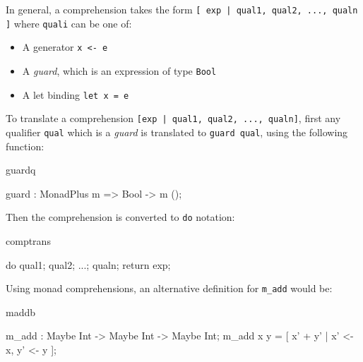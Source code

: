 \noindent
In general, a comprehension takes the form \texttt{[ exp | qual1, qual2, ..., qualn ]} where
\texttt{quali} can be one of:

\begin{itemize}
\item A generator \texttt{x <- e}
\item A \emph{guard}, which is an expression of type \texttt{Bool}
\item A let binding \texttt{let x = e}
\end{itemize}

\noindent
To translate a comprehension \texttt{[exp | qual1, qual2, ..., qualn]}, first
any qualifier
\texttt{qual} which is a \emph{guard} is translated to \texttt{guard qual}, using
the following function:

\begin{SaveVerbatim}{guardq}

guard : MonadPlus m => Bool -> m ();

\end{SaveVerbatim}

\noindent
Then the comprehension is converted to \texttt{do} notation:

\begin{SaveVerbatim}{comptrans}

do { qual1; qual2; ...; qualn; return exp; }

\end{SaveVerbatim}

\noindent
Using monad comprehensions, an alternative definition for \texttt{m\_add} would be:

\begin{SaveVerbatim}{maddb}

m_add : Maybe Int -> Maybe Int -> Maybe Int;
m_add x y = [ x' + y' | x' <- x, y' <- y ];
\end{SaveVerbatim}


